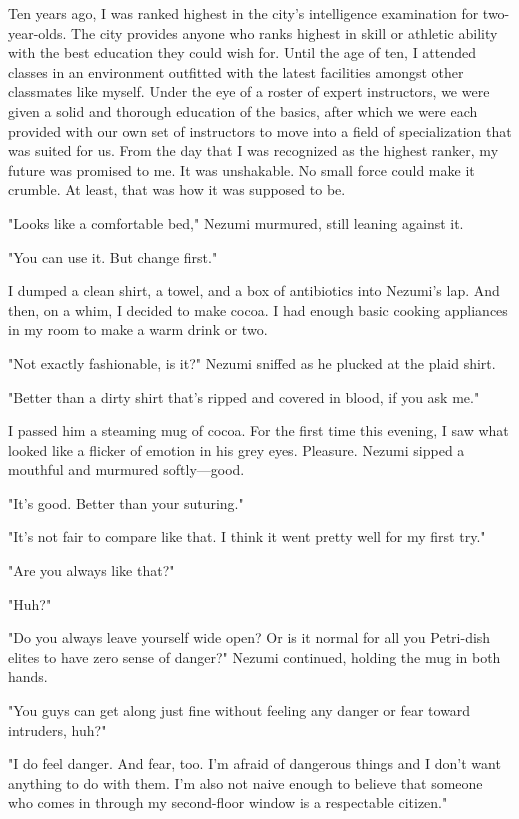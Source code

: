 Ten years ago, I was ranked highest in the city's intelligence
examination for two-year-olds. The city provides anyone who ranks
highest in skill or athletic ability with the best education they could
wish for. Until the age of ten, I attended classes in an environment
outfitted with the latest facilities amongst other classmates like
myself. Under the eye of a roster of expert instructors, we were given a
solid and thorough education of the basics, after which we were each
provided with our own set of instructors to move into a field of
specialization that was suited for us. From the day that I was
recognized as the highest ranker, my future was promised to me. It was
unshakable. No small force could make it crumble. At least, that was how
it was supposed to be.

\myspace

"Looks like a comfortable bed," Nezumi murmured, still leaning against
it.

"You can use it. But change first."

I dumped a clean shirt, a towel, and a box of antibiotics into Nezumi's
lap. And then, on a whim, I decided to make cocoa. I had enough basic
cooking appliances in my room to make a warm drink or two.

"Not exactly fashionable, is it?" Nezumi sniffed as he plucked at the
plaid shirt.

"Better than a dirty shirt that's ripped and covered in blood, if you
ask me."

I passed him a steaming mug of cocoa. For the first time this evening, I
saw what looked like a flicker of emotion in his grey eyes. Pleasure.
Nezumi sipped a mouthful and murmured softly---good.

"It's good. Better than your suturing."

"It's not fair to compare like that. I think it went pretty well for my
first try."

"Are you always like that?"

"Huh?"

"Do you always leave yourself wide open? Or is it normal for all you
Petri-dish elites to have zero sense of danger?" Nezumi continued,
holding the mug in both hands.

"You guys can get along just fine without feeling any danger or fear
toward intruders, huh?"

"I do feel danger. And fear, too. I'm afraid of dangerous things and I
don't want anything to do with them. I'm also not naive enough to
believe that someone who comes in through my second-floor window is a
respectable citizen."

